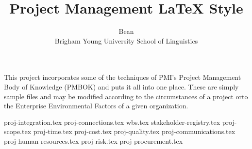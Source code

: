 
\setlength{\topmargin}{-.5in}
\setlength{\textheight}{9in}
\setlength{\oddsidemargin}{.125in}
\setlength{\textwidth}{6.25in}



\title{Project Management {LaTeX} Style}

\author{Bean\\
Brigham Young University School of Linguistics}
\renewcommand{\today}{April 13, 2013}
\maketitle
This project incorporates some of the techniques of PMI's Project Management Body of Knowledge\textregistered {} (PMBOK) and puts it all into one place. These are simply sample files and may be modified according to the circumstances of a project orto the Enterprise Environmental Factors of a given organization.


 {proj-integration.tex}
 {proj-connections.tex}
 {wbs.tex}
 {stakeholder-registry.tex}
 {proj-scope.tex}
 {proj-time.tex}
 {proj-cost.tex}
 {proj-quality.tex}
 {proj-communications.tex}
 {proj-human-resources.tex}
 {proj-risk.tex}
 {proj-procurement.tex}




